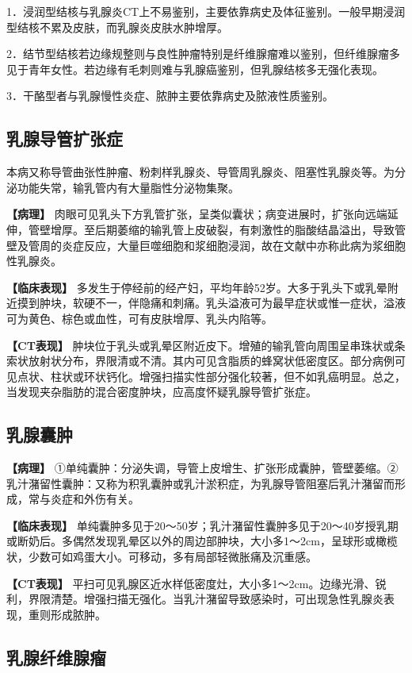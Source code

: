 1．浸润型结核与乳腺炎CT上不易鉴别，主要依靠病史及体征鉴别。一般早期浸润型结核不累及皮肤，而乳腺炎皮肤水肿增厚。

2．结节型结核若边缘规整则与良性肿瘤特别是纤维腺瘤难以鉴别，但纤维腺瘤多见于青年女性。若边缘有毛刺则难与乳腺癌鉴别，但乳腺结核多无强化表现。

3．干酪型者与乳腺慢性炎症、脓肿主要依靠病史及脓液性质鉴别。

\subsection{乳腺导管扩张症}

本病又称导管曲张性肿瘤、粉刺样乳腺炎、导管周乳腺炎、阻塞性乳腺炎等。为分泌功能失常，输乳管内有大量脂性分泌物集聚。

\textbf{【病理】}
肉眼可见乳头下方乳管扩张，呈类似囊状；病变进展时，扩张向远端延伸，管壁增厚。至后期萎缩的输乳管上皮破裂，有刺激性的脂酸结晶溢出，导致管壁及管周的炎症反应，大量巨噬细胞和浆细胞浸润，故在文献中亦称此病为浆细胞性乳腺炎。

\textbf{【临床表现】}
多发生于停经前的经产妇，平均年龄52岁。大多于乳头下或乳晕附近摸到肿块，软硬不一，伴隐痛和刺痛。乳头溢液可为最早症状或惟一症状，溢液可为黄色、棕色或血性，可有皮肤增厚、乳头内陷等。

\textbf{【CT表现】}
肿块位于乳头或乳晕区附近皮下。增殖的输乳管向周围呈串珠状或条索状放射状分布，界限清或不清。其内可见含脂质的蜂窝状低密度区。部分病例可见点状、柱状或环状钙化。增强扫描实性部分强化较著，但不如乳癌明显。总之，当发现夹杂脂肪的混合密度肿块，应高度怀疑乳腺导管扩张症。

\subsection{乳腺囊肿}

\textbf{【病理】}
①单纯囊肿：分泌失调，导管上皮增生、扩张形成囊肿，管壁萎缩。②乳汁潴留性囊肿：又称为积乳囊肿或乳汁淤积症，为乳腺导管阻塞后乳汁潴留而形成，常与炎症和外伤有关。

\textbf{【临床表现】}
单纯囊肿多见于20～50岁；乳汁潴留性囊肿多见于20～40岁授乳期或断奶后。多偶然发现乳晕区以外的周边部肿块，大小多1～2cm，呈球形或橄榄状，少数可如鸡蛋大小。可移动，多有局部轻微胀痛及沉重感。

\textbf{【CT表现】}
平扫可见乳腺区近水样低密度灶，大小多1～2cm。边缘光滑、锐利，界限清楚。增强扫描无强化。当乳汁潴留导致感染时，可出现急性乳腺炎表现，重则形成脓肿。

\subsection{乳腺纤维腺瘤}

